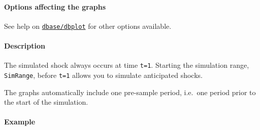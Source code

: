 \paragraph{Options affecting the
graphs}

See help on \href{dbase/dbplot}{\texttt{dbase/dbplot}} for other options
available.

\paragraph{Description}

The simulated shock always occurs at time \texttt{t=1}. Starting the
simulation range, \texttt{SimRange}, before \texttt{t=1} allows you to
simulate anticipated shocks.

The graphs automatically include one pre-sample period, i.e.~one period
prior to the start of the simulation.

\paragraph{Example}



